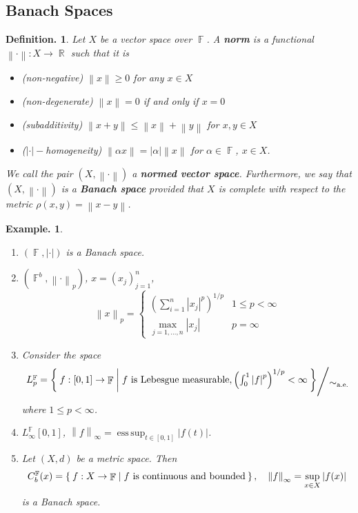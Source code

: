 \documentclass[11pt, a4paper]{memoir}
\DeclareMathOperator{\R}{{\mathbb{R}}}
\DeclareMathOperator{\F}{{\mathbb{F}}}
\newcommand{\norm}[1]{\ensuremath{\left\lVert#1\right\rVert}}
\newcommand{\abs}[1]{\ensuremath{\left\lvert#1\right\rvert}}
\theoremstyle{change}
\theoremstyle{plain}
\theoremstyle{nonumberplain}
\newtheorem{definition}{Definition.}
\newtheorem{example}{Example.}
\newcommand{\quot}[2]{\mathchoice{\left.\raisebox{0.14em}{$#1$}\middle/\raisebox{-0.14em}{$#2$}\right.}
                                 {\left.\raisebox{0.08em}{$#1$}\middle/\raisebox{-0.08em}{$#2$}\right.}
                                 {\left.\raisebox{0.03em}{$#1$}\middle/\raisebox{-0.03em}{$#2$}\right.}
                                 {\left.\raisebox{0em}{$#1$}\middle/\raisebox{0em}{$#2$}\right.}}
\DeclareMathOperator*{\esssup}{ess\,sup}
\numberwithin{equation}{section}
\begin{document}
\subsection{Banach Spaces}
\begin{definition}
    Let $X$ be a vector space over $\F$.
    A \textbf{norm} is a functional $\norm{\cdot}:X\to\R$ such that it is
    \begin{itemize}[nl]
        \item \textit{(non-negative)} $\norm{x}\geq 0$ for any $x\in X$
        \item \textit{(non-degenerate)} $\norm{x}=0$ if and only if $x=0$
        \item \textit{(subadditivity)} $\norm{x+y}\leq\norm{x}+\norm{y}$ for $x,y\in X$
        \item \textit{($\abs{\cdot}-$homogeneity)} $\norm{\alpha x}=\abs{\alpha}\norm{x}$ for $\alpha\in\F$, $x\in X$.
    \end{itemize}
    We call the pair $(X,\norm{\cdot})$ a \textbf{normed vector space}.
    Furthermore, we say that $(X,\norm{\cdot})$ is a \textbf{Banach space}  provided that $X$ is complete with respect to the metric $\rho(x,y)=\norm{x-y}$.
\end{definition}
\begin{example}
    \begin{enumerate}[r]
        \item $(\F,\abs{\cdot})$ is a Banach space.
        \item $(\F^b,\norm{\cdot}_p)$, $x=(x_j)_{j=1}^n$,
            \begin{equation*}
                \norm{x}_p=\begin{cases}
                    \left(\sum_{i=1}^n\abs{x_j}^p\right)^{1/p} & 1\leq p<\infty\\
                    \max_{j=1,\ldots,n}|x_j| & p=\infty
                \end{cases}
            \end{equation*}
        \item Consider the space
            \begin{equation*}
                \quot{L_p^{\F}=\Set{f:[0,1]\to\F | f\text{ is Lebesgue measurable}, \left(\int_0^1\abs{f}^p\right)^{1/p}<\infty}}{\sim_{\text{a.e.}}}
            \end{equation*}
            where $1\leq p<\infty$.
        \item $\displaystyle L_\infty^{\F}[0,1]$, $\norm{f}_\infty=\esssup_{t\in[0,1]}|f(t)|$.
        \item Let $(X,d)$ be a metric space.
            Then
            \begin{equation*}
                C_b^{\F}(x)=\Set{f:X\to\F | f\text{ is continuous and bounded}},\quad\norm{f}_\infty=\sup_{x\in X}|f(x)|
            \end{equation*}
            is a Banach space.
    \end{enumerate}
\end{example}
\end{document}
